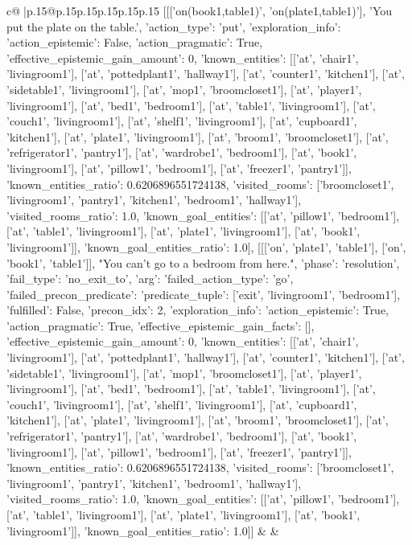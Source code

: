 \documentclass{article}
\begin{document}
{\begin{supertabular}{c@{$\;$}|p{.15\linewidth}@{}p{.15\linewidth}p{.15\linewidth}p{.15\linewidth}p{.15\linewidth}p{.15\linewidth}}
{{{	 [[['on(book1,table1)', 'on(plate1,table1)'], 'You put the plate on the table.', {'action_type': 'put', 'exploration_info': {'action_epistemic': False, 'action_pragmatic': True, 'effective_epistemic_gain_amount': 0, 'known_entities': [['at', 'chair1', 'livingroom1'], ['at', 'pottedplant1', 'hallway1'], ['at', 'counter1', 'kitchen1'], ['at', 'sidetable1', 'livingroom1'], ['at', 'mop1', 'broomcloset1'], ['at', 'player1', 'livingroom1'], ['at', 'bed1', 'bedroom1'], ['at', 'table1', 'livingroom1'], ['at', 'couch1', 'livingroom1'], ['at', 'shelf1', 'livingroom1'], ['at', 'cupboard1', 'kitchen1'], ['at', 'plate1', 'livingroom1'], ['at', 'broom1', 'broomcloset1'], ['at', 'refrigerator1', 'pantry1'], ['at', 'wardrobe1', 'bedroom1'], ['at', 'book1', 'livingroom1'], ['at', 'pillow1', 'bedroom1'], ['at', 'freezer1', 'pantry1']], 'known_entities_ratio': 0.6206896551724138, 'visited_rooms': ['broomcloset1', 'livingroom1', 'pantry1', 'kitchen1', 'bedroom1', 'hallway1'], 'visited_rooms_ratio': 1.0, 'known_goal_entities': [['at', 'pillow1', 'bedroom1'], ['at', 'table1', 'livingroom1'], ['at', 'plate1', 'livingroom1'], ['at', 'book1', 'livingroom1']], 'known_goal_entities_ratio': 1.0}}], [[['on', 'plate1', 'table1'], ['on', 'book1', 'table1']], "You can't go to a bedroom from here.", {'phase': 'resolution', 'fail_type': 'no_exit_to', 'arg': {'failed_action_type': 'go', 'failed_precon_predicate': {'predicate_tuple': ['exit', 'livingroom1', 'bedroom1'], 'fulfilled': False, 'precon_idx': 2}}, 'exploration_info': {'action_epistemic': True, 'action_pragmatic': True, 'effective_epistemic_gain_facts': [], 'effective_epistemic_gain_amount': 0, 'known_entities': [['at', 'chair1', 'livingroom1'], ['at', 'pottedplant1', 'hallway1'], ['at', 'counter1', 'kitchen1'], ['at', 'sidetable1', 'livingroom1'], ['at', 'mop1', 'broomcloset1'], ['at', 'player1', 'livingroom1'], ['at', 'bed1', 'bedroom1'], ['at', 'table1', 'livingroom1'], ['at', 'couch1', 'livingroom1'], ['at', 'shelf1', 'livingroom1'], ['at', 'cupboard1', 'kitchen1'], ['at', 'plate1', 'livingroom1'], ['at', 'broom1', 'broomcloset1'], ['at', 'refrigerator1', 'pantry1'], ['at', 'wardrobe1', 'bedroom1'], ['at', 'book1', 'livingroom1'], ['at', 'pillow1', 'bedroom1'], ['at', 'freezer1', 'pantry1']], 'known_entities_ratio': 0.6206896551724138, 'visited_rooms': ['broomcloset1', 'livingroom1', 'pantry1', 'kitchen1', 'bedroom1', 'hallway1'], 'visited_rooms_ratio': 1.0, 'known_goal_entities': [['at', 'pillow1', 'bedroom1'], ['at', 'table1', 'livingroom1'], ['at', 'plate1', 'livingroom1'], ['at', 'book1', 'livingroom1']], 'known_goal_entities_ratio': 1.0}}]] 
	  } 
	   } 
	   } 
	 & & \\ 
 


\end{supertabular}}
\end{document}
